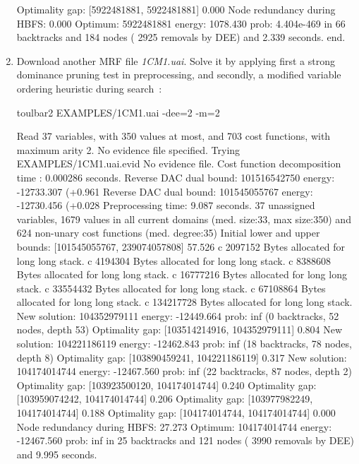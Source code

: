 \begin{enumerate}
{\begin{DoxyCode}
Optimality gap: [5922481881, 5922481881] 0.000 %
Node redundancy during HBFS: 0.000 %
Optimum: 5922481881 energy: 1078.430 prob: 4.404e-469 in 66 backtracks and 184 nodes ( 2925 removals by DEE) and 2.339 seconds.
end.
\end{DoxyCode}}
\item Download another MRF file {\em 1CM1.uai}. Solve it by applying first a strong dominance pruning test in preprocessing, and secondly, a modified variable ordering heuristic during search~\cite{Schiex14a}:
\begin{DoxyCode}
	toulbar2 EXAMPLES/1CM1.uai -dee=2 -m=2
\end{DoxyCode}
{\scriptsize
\begin{DoxyCode}
Read 37 variables, with 350 values at most, and 703 cost functions, with maximum arity 2.
No evidence file specified. Trying EXAMPLES/1CM1.uai.evid
No evidence file. 
Cost function decomposition time : 0.000286 seconds.
Reverse DAC dual bound: 101516542750 energy: -12733.307 (+0.961%
Reverse DAC dual bound: 101545055767 energy: -12730.456 (+0.028%
Preprocessing time: 9.087 seconds.
37 unassigned variables, 1679 values in all current domains (med. size:33, max size:350) and 624 non-unary cost functions (med. degree:35)
Initial lower and upper bounds: [101545055767, 239074057808] 57.526%
c 2097152 Bytes allocated for long long stack.
c 4194304 Bytes allocated for long long stack.
c 8388608 Bytes allocated for long long stack.
c 16777216 Bytes allocated for long long stack.
c 33554432 Bytes allocated for long long stack.
c 67108864 Bytes allocated for long long stack.
c 134217728 Bytes allocated for long long stack.
New solution: 104352979111 energy: -12449.664 prob: inf (0 backtracks, 52 nodes, depth 53)
Optimality gap: [103514214916, 104352979111] 0.804 %
New solution: 104221186119 energy: -12462.843 prob: inf (18 backtracks, 78 nodes, depth 8)
Optimality gap: [103890459241, 104221186119] 0.317 %
New solution: 104174014744 energy: -12467.560 prob: inf (22 backtracks, 87 nodes, depth 2)
Optimality gap: [103923500120, 104174014744] 0.240 %
Optimality gap: [103959074242, 104174014744] 0.206 %
Optimality gap: [103977982249, 104174014744] 0.188 %
Optimality gap: [104174014744, 104174014744] 0.000 %
Node redundancy during HBFS: 27.273 %
Optimum: 104174014744 energy: -12467.560 prob: inf in 25 backtracks and 121 nodes ( 3990 removals by DEE) and 9.995 seconds.

\end{DoxyCode}}
\end{enumerate}
